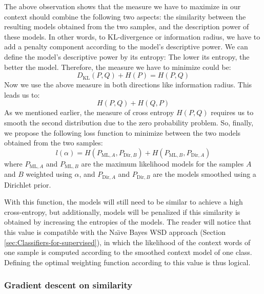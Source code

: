 \documentclass[english]{jnlp_1.4}
\begin{document}
The above observation shows that the measure we have to maximize in
our context should combine the following two aspects: the similarity
between the resulting models obtained from the two samples, and the
description power of these models. In other words, to KL-divergence
or information radius, we have to add a penalty component according
to the model's descriptive power. We can define the model's descriptive
power by its entropy: The lower its entropy, the better the model.
Therefore, the measure we have to minimize could be:\[
D_{\mathrm{KL}}(P,Q)+H(P)=H(P,Q)\]
Now we use the above measure in both directions like information radius.
This leads us to:
\[
H(P,Q)+H(Q,P)
\]
As we mentioned earlier, the measure of cross entropy $H(P,Q)$ requires
us to smooth the second distribution due to the zero probability problem.
So, finally, we propose the following loss function to minimize between
the two models obtained from the two samples:
\[
l(\alpha)=H(P_{\mathrm{ML},A},P_{\mathrm{Dir},B})+H(P_{\mathrm{ML},B},P_{\mathrm{Dir},A})
\]
where $P_{\mathrm{ML},A}$ and $P_{\mathrm{ML},B}$ are the maximum
likelihood models for the samples $A$ and $B$ weighted using $\alpha$,
and $P_{\mathrm{Dir},A}$ and $P_{\mathrm{Dir},B}$ are the models
smoothed using a Dirichlet prior.

With this function, the models will still need to be similar to achieve
a high cross-entropy, but additionally, models will be penalized if
this similarity is obtained by increasing the entropies of the models.
The reader will notice that this value is compatible with the Na\"{\i}ve
Bayes WSD approach (Section \ref{sec:Classifiers-for-supervised}),
in which the likelihood of the context words of one sample is computed
according to the smoothed context model of one class. Defi{}ning the
optimal weighting function according to this value is thus logical. 


\subsubsection{Gradient descent on similarity}
\end{document}

